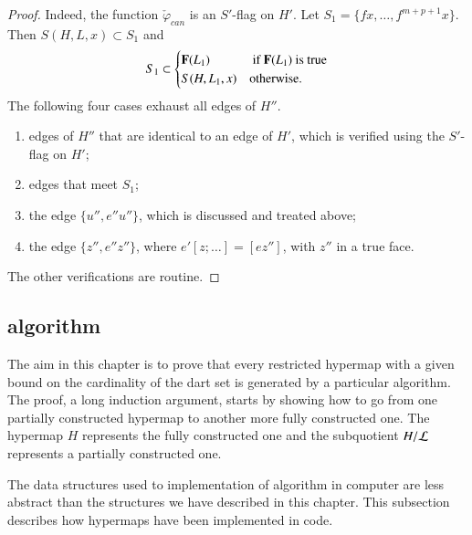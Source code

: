 \begin{proof}
   Indeed, the
function $\check\varphi_{can}$ is an $S'$-flag on $H'$.  
Let $S_1 = \{f x,\ldots,f^{m+p+1} x \}$.  Then
$S(H,L,x)\subset S_1$ and
\[
 S_1 \subset \begin{cases} {\mathbf F}(L_1) & \text{ if } {\mathbf F}(L_1) \text{ is true}
\\ S(H,L_1,x) & \text{otherwise}.\end{cases}
\]
The following four cases exhaust all edges of $H''$.
\begin{enumerate}
\item edges of $H''$ that are identical to an edge of $H'$, which is
verified using  the $S'$-flag on $H'$;
\item edges that meet $S_1$;
\item the edge $\{u'',e''u''\}$, which is discussed and treated above;
\item the edge $\{z'',e''z''\}$, 
where $e'[z;\ldots]=[ez'']$, with $z''$ in a true face.
\end{enumerate}


The other verifications are routine.
\end{proof}


\subsection{algorithm}\label{sec:hypermap-algorithm}

The aim in this chapter is to prove that every restricted hypermap
with a given bound on the cardinality of the dart set is generated by
a particular algorithm.  The proof, a long induction argument, starts
by showing how to go from one partially constructed hypermap to
another more fully constructed one.  The hypermap $H$ represents the
fully constructed one and the subquotient $H/{\cal L}$ represents a
partially constructed one.

The data structures used to implementation of algorithm in computer
are less abstract than the structures we have described in this
chapter.  This subsection describes how hypermaps have been
implemented in code.


